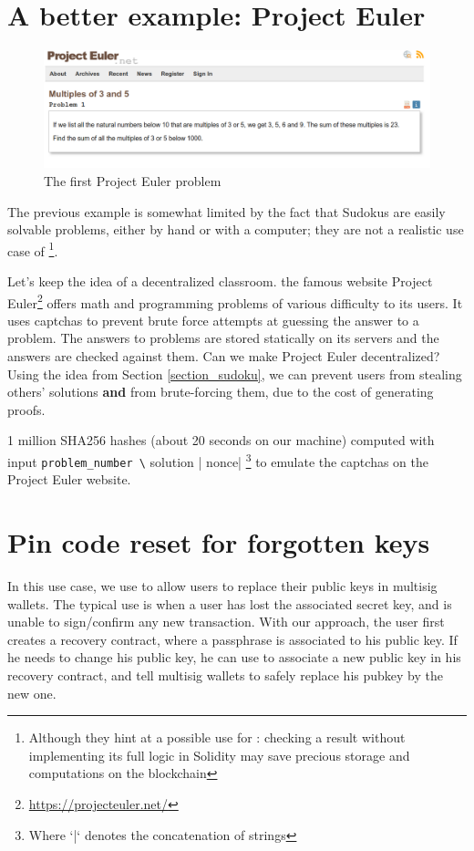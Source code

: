 \documentclass[10pt,a4paper]{article}
\begin{document}
\section{A better example: Project Euler}
\label{section_euler}

	\begin{figure}[!h]
	\centering
	\includegraphics[width=\textwidth]{euler}
	\caption{The first Project Euler problem}
\end{figure}

The previous example is somewhat limited by the fact that Sudokus are easily solvable problems, either by hand or with a computer; they are not a realistic use case of \zksnarks{}\footnote{Although they hint at a possible use for \zksnarks{}: checking a result without implementing its full logic in Solidity may save precious storage and computations on the blockchain}.

Let's keep the idea of a decentralized classroom. the famous website Project Euler\footnote{\url{https://projecteuler.net/}} offers math and programming problems of various difficulty to its users. It uses captchas to prevent brute force attempts at guessing the answer to a problem. The answers to problems are stored statically on its servers and the answers are checked against them. Can we make Project Euler decentralized? Using the idea from Section \ref{section_sudoku}, we can prevent users from stealing others' solutions \textbf{and} from brute-forcing them, due to the cost of generating proofs.

1 million SHA256 hashes (about 20 seconds on our machine) computed with input \verb|problem_number \| solution | nonce| \footnote{Where `|` denotes the concatenation of strings} to emulate the captchas on the Project Euler website.


\section{Pin code reset for forgotten keys}
\label{section_pincode}

In this use case, we use \zksnarks{} to allow users to replace their
public keys in multisig wallets. The typical use is when a user has
lost the associated secret key, and is unable to sign/confirm any new
transaction. With our approach, the user first creates a recovery
contract, where a passphrase is associated to his public key. If he
needs to change his public key, he can use \zksnarks{} to associate a new
public key in his recovery contract, and tell multisig wallets to
safely replace his pubkey by the new one.
\end{document}
